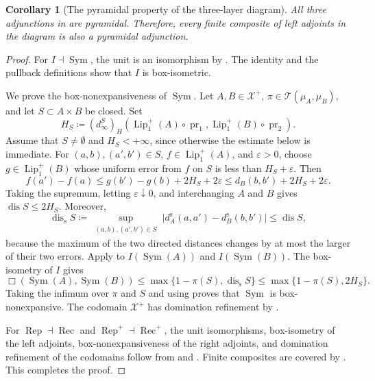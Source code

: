 \documentclass{amsart}
\theoremstyle{plain}
\newtheorem{corollary}[theorem]{Corollary}
\theoremstyle{definition}
\theoremstyle{remark}
\newcommand{\Xp}{\mathcal{X}^{+}}
\newcommand{\lipplus}{\operatorname{Lip}^{+}_{1}}
\DeclareMathOperator{\dis}{dis}
\DeclareMathOperator{\pr}{pr}
\newcommand{\dinf}[1]{d^{#1}_{\infty}}
\newcommand{\haus}[1]{\left(#1\right)_H}
\newcommand{\Tplan}{\mathcal{T}}
\begin{document}
\begin{corollary}[The pyramidal property of the three-layer diagram]
\label{cor:figure-adjunctions-pyramidal}
All three adjunctions in  are pyramidal. Therefore, every finite composite of left adjoints in the diagram is also a pyramidal adjunction.
\end{corollary}

\begin{proof}
For $I\dashv\operatorname{Sym}$, the unit is an isomorphism by . The identity  and the pullback definitions show that $I$ is box-isometric.

We prove the box-nonexpansiveness of $\operatorname{Sym}$. Let $A,B\in\Xp$, $\pi\in\Tplan(\mu_A,\mu_B)$, and let $S\subset A\times B$ be closed. Set
\[H_S\coloneqq\haus{\dinf{S}}(\lipplus(A)\circ\pr_1,\lipplus(B)\circ\pr_2).\]
Assume that $S\neq\emptyset$ and $H_S<+\infty$, since otherwise the estimate below is immediate. For $(a,b),(a',b')\in S$, $f\in\lipplus(A)$, and $\varepsilon>0$, choose $g\in\lipplus(B)$ whose uniform error from $f$ on $S$ is less than $H_S+\varepsilon$. Then
\[
f(a')-f(a)\leq g(b')-g(b)+2H_S+2\varepsilon
\leq d_B(b,b')+2H_S+2\varepsilon.
\]
Taking the supremum, letting $\varepsilon\downarrow0$, and interchanging $A$ and $B$ gives $\dis S\leq2H_S$. Moreover,
\[
\dis_{\mathrm s}S\coloneqq
\sup_{\substack{(a,b),(a',b')\in S}}
\bigl|d_A^{\mathrm s}(a,a')-d_B^{\mathrm s}(b,b')\bigr|
\leq\dis S,
\]
because the maximum of the two directed distances changes by at most the larger of their two errors. Apply  to $I(\operatorname{Sym}(A))$ and $I(\operatorname{Sym}(B))$. The box-isometry of $I$ gives
\[
\Box(\operatorname{Sym}(A),\operatorname{Sym}(B))
\leq\max\{1-\pi(S),\dis_{\mathrm s}S\}
\leq\max\{1-\pi(S),2H_S\}.
\]
Taking the infimum over $\pi$ and $S$ and using  proves that $\operatorname{Sym}$ is box-nonexpansive. The codomain $\Xp$ has domination refinement by .

For $\operatorname{Rep}\dashv\operatorname{Rec}$ and $\operatorname{Rep}^{+}\dashv\operatorname{Rec}^{+}$, the unit isomorphisms, box-isometry of the left adjoints, box-nonexpansiveness of the right adjoints, and domination refinement of the codomains follow from  and \cite[Lemma~5.4]{gds2}. Finite composites are covered by .
This completes the proof.
\end{proof}
\end{document}
